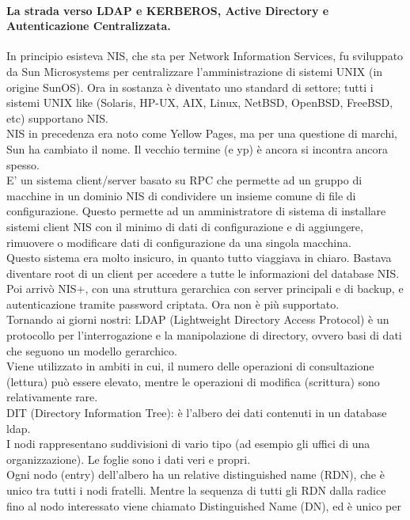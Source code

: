 \documentclass[a4paper]{report}
\begin{document}
\paragraph{La strada verso LDAP e KERBEROS, Active Directory e Autenticazione Centralizzata.}
In principio esisteva NIS, che sta per Network Information Services, fu sviluppato da Sun Microsystems
per centralizzare l'amministrazione di sistemi UNIX (in origine SunOS). Ora in
sostanza è diventato uno standard di settore; tutti i sistemi UNIX like (Solaris,
HP-UX, AIX, Linux, NetBSD, OpenBSD, FreeBSD, etc) supportano NIS.\\
NIS in precedenza era noto come Yellow Pages, ma per una questione di marchi,
Sun ha cambiato il nome. Il vecchio termine (e yp) è ancora si incontra ancora
spesso.\\
E' un sistema client/server basato su RPC che permette ad un gruppo di macchine
in un dominio NIS di condividere un insieme comune di file di configurazione.
Questo permette ad un amministratore di sistema di installare sistemi client NIS con
il minimo di dati di configurazione e di aggiungere, rimuovere o modificare dati di
configurazione da una singola macchina.\\
Questo sistema era molto insicuro, in quanto tutto viaggiava in chiaro. Bastava diventare root di un client per accedere a tutte le informazioni del database NIS.\\
Poi arrivò NIS+, con una struttura gerarchica con server principali e di backup, e autenticazione tramite password criptata. Ora non è più supportato.\\
Tornando ai giorni nostri: LDAP (Lightweight Directory Access
Protocol) è un protocollo per l'interrogazione e
la manipolazione di directory, ovvero basi di
dati che seguono un modello gerarchico.\\
Viene utilizzato in ambiti in cui, il numero delle
operazioni di consultazione (lettura) può
essere elevato, mentre le operazioni di
modifica (scrittura) sono relativamente rare.\\
DIT (Directory Information Tree): è l’albero dei dati contenuti in un database
ldap.\\
I nodi rappresentano suddivisioni di vario tipo (ad esempio gli uffici di una
organizzazione). Le foglie sono i dati veri e propri.\\
Ogni nodo (entry) dell'albero ha un relative distinguished name (RDN), che è
unico tra tutti i nodi fratelli. Mentre la sequenza di tutti gli RDN dalla radice fino al
nodo interessato viene chiamato Distinguished Name (DN), ed è unico per
\end{document}
